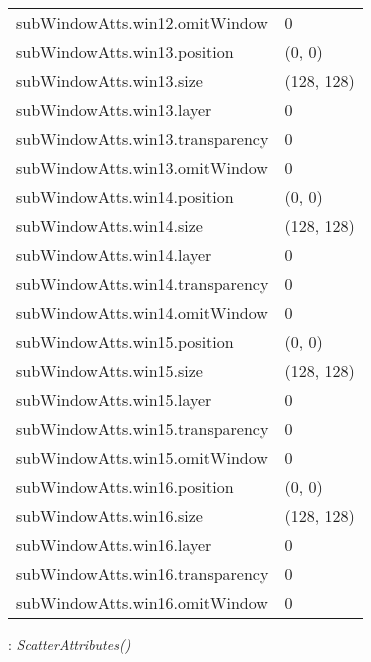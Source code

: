 \documentclass[10pt,a4paper]{report}
\begin{document}
\begin{longtable}{ll}
subWindowAtts.win12.omitWindow  &  0 \\
subWindowAtts.win13.position  &  (0, 0) \\
subWindowAtts.win13.size  &  (128, 128) \\
subWindowAtts.win13.layer  &  0 \\
subWindowAtts.win13.transparency  &  0 \\
subWindowAtts.win13.omitWindow  &  0 \\
subWindowAtts.win14.position  &  (0, 0) \\
subWindowAtts.win14.size  &  (128, 128) \\
subWindowAtts.win14.layer  &  0 \\
subWindowAtts.win14.transparency  &  0 \\
subWindowAtts.win14.omitWindow  &  0 \\
subWindowAtts.win15.position  &  (0, 0) \\
subWindowAtts.win15.size  &  (128, 128) \\
subWindowAtts.win15.layer  &  0 \\
subWindowAtts.win15.transparency  &  0 \\
subWindowAtts.win15.omitWindow  &  0 \\
subWindowAtts.win16.position  &  (0, 0) \\
subWindowAtts.win16.size  &  (128, 128) \\
subWindowAtts.win16.layer  &  0 \\
subWindowAtts.win16.transparency  &  0 \\
subWindowAtts.win16.omitWindow  &  0 \\
\end{longtable}

\newpage

{}
: {\it ScatterAttributes() }\\[-3mm]
\end{document}
